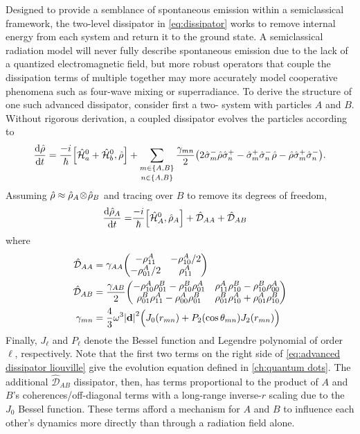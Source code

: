 Designed to provide a semblance of spontaneous emission within a semiclassical framework, the two-level dissipator in \cref{eq:dissipator} works to remove internal energy from each \qd{} system and return it to the ground state.
A semiclassical radiation model will never fully describe spontaneous emission due to the lack of a quantized electromagnetic field, but more robust operators that couple the dissipation terms of multiple \qds{} together may more accurately model cooperative phenomena such as four-wave mixing or superradiance. 
To derive the structure of one such advanced dissipator, consider first a two-\qd{} system with particles $A$ and $B$.
Without rigorous derivation, a coupled dissipator evolves the particles according to
\begin{equation}
  \dv{\hat{\rho}}{t} = \frac{-i}{\hbar} \commutator{\hat{\mathcal{H}}_a^0 + \hat{\mathcal{H}}_b^0}{\hat{\rho}} + \sum_{\shortstack{$\scriptstyle m \in \qty{A, B}$\\$\scriptstyle n \in \qty{A, B}$}} \frac{\gamma_{mn}}{2} \qty(2 \hat{\sigma}_m^- \hat{\rho} \hat{\sigma}_n^+ - \hat{\sigma}_m^+ \hat{\sigma}_n^- \hat{\rho} - \hat{\rho} \hat{\sigma}_m^+ \hat{\sigma}_n^-).
\end{equation}
Assuming $\hat{\rho} \approx \hat{\rho}_A \! \otimes \! \hat{\rho}_B$ and tracing over $B$ to remove its degrees of freedom,
\begin{equation}
  \begin{aligned}
    \dv{\hat{\rho}_A}{t} =& \frac{-i}{\hbar} \commutator{\hat{\mathcal{H}}_A^0}{\hat{\rho}_A} + \hat{\mathcal{D}}_{AA} + \hat{\mathcal{D}}_{AB}
  \end{aligned}
  \label{eq:advanced dissipator liouville}
\end{equation}
where
\begin{subequations}
  \begin{align}
    \hat{\mathcal{D}}_{AA} &= \gamma_{AA} \mqty(-\rho_{11}^A & -\rho_{10}^A/2 \\ -\rho_{01}^A/2 & \rho_{11}^A) \\
    \hat{\mathcal{D}}_{AB} &= \frac{\gamma_{AB}}{2} \mqty(-\rho_{10}^A\rho_{01}^B - \rho_{10}^B \rho_{01}^A & \rho_{11}^A\rho_{10}^B - \rho_{10}^B\rho_{00}^A \\ \rho_{01}^B\rho_{11}^A - \rho_{00}^A\rho_{01}^B & \rho_{01}^B \rho_{10}^A + \rho_{01}^A \rho_{10}^B) \\
    \gamma_{mn} &= \frac{4}{3}\omega^3 \abs{\vb{d}}^2 \qty\Big(J_0(r_{mn}) + P_2(\cos \theta_{mn}) J_2(r_{mn}))
  \end{align}
  \label{eq:cross matrices}
\end{subequations}
Finally, $J_\ell$ and $P_\ell$ denote the Bessel function and Legendre polynomial of order $\ell$, respectively.
Note that the first two terms on the right side of \cref{eq:advanced dissipator liouville} give the evolution equation defined in \cref{ch:quantum dots}.
The additional $\hat{\mathcal{D}}_{AB}$ dissipator, then, has terms proportional to the product of $A$ and $B$'s coherences/off-diagonal terms with a long-range inverse-$r$ scaling due to the $J_0$ Bessel function.
These terms afford a mechanism for $A$ and $B$ to influence each other's dynamics more directly than through a radiation field alone.


